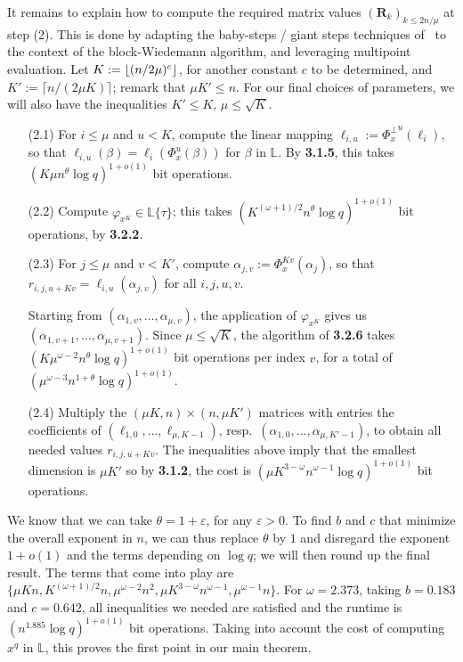\documentclass[sigconf]{acmart}
\renewcommand{\L}{\mathbb{L}}
\newcommand{\ang}[1]{\{#1\}}
\DeclarePairedDelimiter\floor{\lfloor}{\rfloor}
\begin{document}
It remains to explain how to compute the required matrix values $({\bm
  R}_k)_{k \le 2n/\mu}$ at step (2). This is done by adapting the
baby-steps / giant steps techniques of~\cite[Algorithm {\bf
    AP}]{KaSh98} to the context of the block-Wiedemann algorithm, and
leveraging multipoint evaluation.  Let $K:=\floor*{ (n/2\mu)^{c}}$,
for another constant $c$ to be determined, and $K':=\lceil n/(2\mu K)
\rceil$; remark that $\mu K' \le n$.  For our final choices of
parameters, we will also have the inequalities $K' \le K$, $\mu \le
\sqrt{K}$.
\begin{enumerate}
\item[(2.1)] For $i \le \mu$ and $u < K$, compute the linear mapping
  $\ell_{i,u}:= {\Phi_x^\perp}^u(\ell_i)$, so that $\ell_{i,u}(\beta)
  = \ell_i( \Phi_x^u(\beta) )$ for $\beta$ in $\L$. By {\bf 3.1.5},
  this takes $ (K \mu n^{\theta} \log q)^{1+o(1)}$ bit
  operations.

\item[(2.2)] Compute $\varphi_{x^K} \in \L\ang{\tau}$; 
  this takes $(K^{(\omega+1)/2}n^\theta \log q)^{1+o(1)}$ bit
  operations, by {\bf 3.2.2}.

\item[(2.3)] For $j \le \mu$ and $v < K'$, compute $\alpha_{j,v} :=
  \Phi_x^{Kv}(\alpha_j)$, so that $r_{i,j,u+Kv} =
  \ell_{i,u}(\alpha_{j,v})$ for all $i,j,u,v$.

Starting from $(\alpha_{1,v},\dots,\alpha_{\mu,v})$, the application
of $\varphi_{x^K}$ gives us
$(\alpha_{1,v+1},\dots,\alpha_{\mu,v+1})$. Since $\mu \le \sqrt{K}$,
the algorithm of {\bf 3.2.6} takes $ (K \mu^{\omega-2} n^{\theta} \log
q)^{1+o(1)}$ bit operations per index $v$, for a total of
$(\mu^{\omega-3} n^{1+\theta} \log q)^{1+o(1)}$.

\item[(2.4)] Multiply the $(\mu K,n) \times (n,\mu K')$ matrices with
  entries the coefficients of $(\ell_{1,0},\dots,\ell_{\mu,K-1})$,
  resp.\, $(\alpha_{1,0},\dots,\alpha_{\mu,K'-1})$, to obtain all
  needed values $r_{i,j,u+Kv}$.  The inequalities above imply that the
  smallest dimension is $\mu K'$ so by {\bf 3.1.2}, the cost is $(\mu
  K^{3-\omega} n^{\omega-1} \log q)^{1 + o(1)}$ bit operations.
\end{enumerate}
We know that we can take $\theta=1+\varepsilon$, for any $\varepsilon
> 0$. To find $b$ and $c$ that minimize the overall exponent in $n$, we can
thus replace $\theta$ by $1$ and disregard the exponent $1+o(1)$ and
the terms depending on $\log q$; we will then round up the final
result.  The terms that come into play are $\{\mu K n,
K^{(\omega+1)/2}n, \mu^{\omega-2} n^2, \mu K^{3-\omega}n^{\omega-1},
\mu^{\omega-1} n\}$.  For $\omega = 2.373$, taking $b = 0.183$ and
$c=0.642$, all inequalities we needed are satisfied and the runtime is
$(n^{1.885} \log q)^{1 + o(1)}$ bit operations. Taking into account
the cost of computing $x^q$ in $\L$, this proves the first point in
our main theorem.
\end{document}

